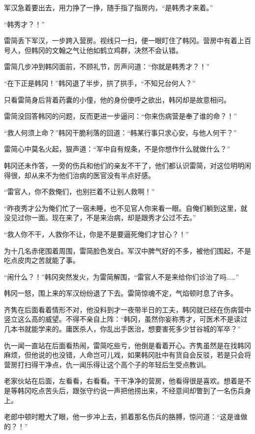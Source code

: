 军汉急着要出去，用力挣了一挣，随手指了指房内，“是韩秀才来着。”

“韩秀才？！”

雷简丢下军汉，一步跨入营房。视线只一扫，便一眼盯住了韩冈。营房中有着上百号人，但韩冈的文翰之气让他如鹤立鸡群，决然不会认错。

雷简几步冲到韩冈面前，不顾礼节，厉声问道：“你就是韩秀才？！”

“在下正是韩冈！”韩冈退了半步，拱了拱手，“不知兄台何人？”

只看雷简身后背着药囊的小僮，他的身份便呼之欲出，韩冈却是故意相问。

雷简没回答韩冈的问题，反而更进一步逼问：“你来伤病营是奉了谁的命？！”

“救人何须上命？”韩冈干脆利落的回道：“韩某行事只求心安，与他人何干？”

雷简心中莫名火起，狠声道：“军中自有规条，不是你想作什么就做什么？”

韩冈还未作答，一旁的伤兵和他们的亲友不干了，他们都认识雷简，对这位明明闲得很，却从来不为他们治病的医官没有半点好感。

“雷官人，你不救俺们，也别拦着不让别人救啊！”

“昨夜秀才公为俺们忙了一宿未睡，也不见官人你来看一眼。自俺们躺到这里，就没见过你一面。现在来了，不是来治病，却是跟秀才公过不去。”

“救人你不干，人救你不让，你是不是要逼死俺们才甘心？！”

为十几名赤佬围着周围，雷简脸色发白。军汉中脾气好的不多，被他们围起，不是吃点皮肉之苦就能了事。

“闹什么？！”韩冈突然发火，为雷简解围，“雷官人不是来给你们诊治了吗……”

韩冈一怒，围上来的军汉纷纷退了下去。雷简惊魂不定，气焰顿时息了许多。

齐隽在后面看着情形不对，他没料到才一夜带半日的工夫，韩冈就已经在伤病营中竖立这么高的威望。不得不亲自上阵：“韩冈，虽然你妄称秀才，可医术不是读过几本书就能学来的。庸医杀人，你乱出手医治，想要害死多少甘谷城的军卒？”

仇一闻一直站在后面看热闹，雷简吃些亏，他倒是看着开心。齐隽虽然是在找韩冈麻烦，但他说的也没错，人命岂可儿戏，如果韩冈肚中有货自会反驳，若是只会将营房打扫得干净点，仇一闻乐得让这个高个子的年轻后生受点教训。

老家伙站在后面，左看看，右看看。干干净净的营房，他看得很是喜欢。想着是不是等韩冈吃点苦头后，跟张守约说一声把他捞出来，不经意间却瞥到了一名伤兵身上。

老郎中顿时瞪大了眼，他一步冲上去，抓着那名伤兵的胳膊，惊问道：“这是谁做的？！”

